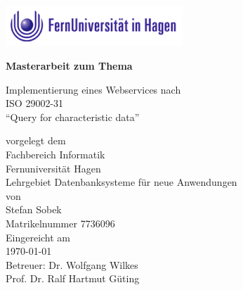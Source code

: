 \begin{titlepage}
\vspace{4em}
\begin{center}
	\includegraphics[width=0.50\textwidth]{images/feulogo.png}
\end{center}
\center

 \Large{\textsf{\textbf{Masterarbeit zum Thema}}}
 \vspace{1em}

\Huge{\textsf{Implementierung eines Webservices nach \\ ISO 29002-31 \\  \enquote{Query for characteristic data}}}
\vspace{1em}
\\


\vspace{1em}

{\normalsize 
\textsf{
vorgelegt dem\\
Fachbereich Informatik\\Fernuniversität Hagen\\Lehrgebiet Datenbanksysteme für neue Anwendungen
}
}
\vspace{2em}
\\

\normalsize{
	\textsf{
	von \\
Stefan Sobek \\ 
Matrikelnummer 7736096 \\
\vspace{2em}
Eingereicht am \\  
\today
\vspace{3em}
\\
Betreuer: Dr. Wolfgang Wilkes\\
Prof. Dr. Ralf Hartmut Güting \\
}
}
\end{titlepage}